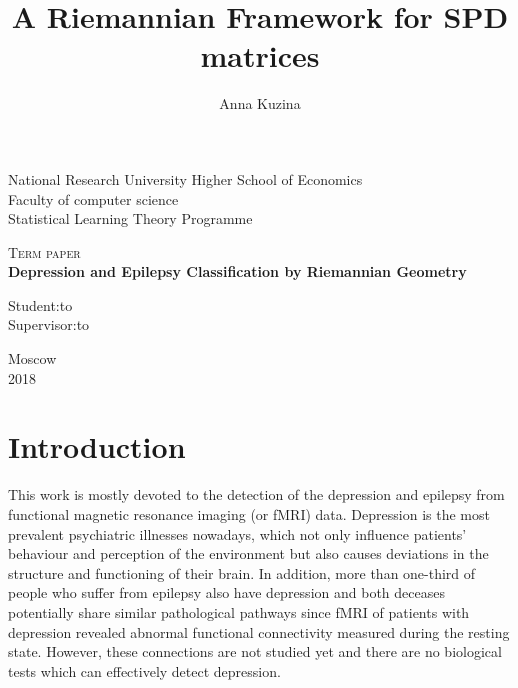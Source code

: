 \documentclass[12pt]{extarticle}
\title{A Riemannian Framework for SPD matrices}
\author{Anna Kuzina}
\theoremstyle{definition}
\theoremstyle{remark}
\begin{document}
	
	\begin{titlepage}
		\begin{center}
			National Research University Higher School of Economics\\
			\large
			\vspace{0.5cm}
			Faculty of computer science\\
			\vspace{0.25cm}
			Statistical Learning Theory Programme
			\vfill
			
			\textsc{Term paper}\\[5mm]
			{\textbf{\large Depression and Epilepsy Classification by Riemannian Geometry}\\[2mm]}
			\bigskip   
		\end{center}
		\vfill
		\vfill
		
		\newbox{\lbox}  \newlength{\maxl} \setlength{\maxl}{\wd\lbox}
		\hfill\parbox{8cm}{ \hspace*{5cm}\hspace*{-5cm}Student:\hfill\hbox to\\ \hspace*{5cm}\hspace*{-5cm}Supervisor:\hfill\hbox to\\  } 
		
		\vfill
		
		
		
		\begin{center}
			Moscow\\ 2018
		\end{center}
		
	\end{titlepage}
	
	\tableofcontents
	\newpage
	
	\section{Introduction}
	
	This work is mostly devoted to the detection of the depression and epilepsy from functional magnetic resonance imaging (or fMRI) data. Depression is the most prevalent psychiatric illnesses nowadays, which not only influence patients' behaviour and perception of the environment but also causes deviations in the structure and functioning of their brain. In addition, more than one-third of people who suffer from epilepsy also have depression and both deceases potentially share similar pathological pathways since fMRI of patients with depression revealed abnormal functional connectivity measured during the resting state. However, these connections are not studied yet and there are no biological tests which can effectively detect depression.
	
\end{document}

